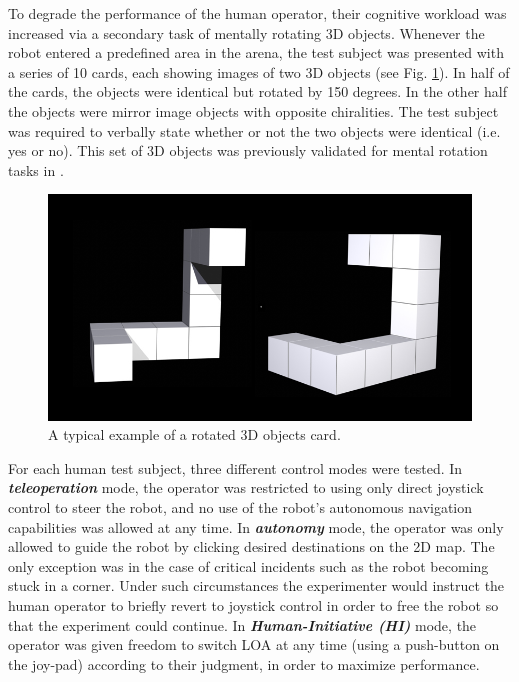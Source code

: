 \documentclass[a4paper,12pt,oneside,openright]{bhamthesis}
\begin{document}
To degrade the performance of the human operator, their cognitive workload was increased via a secondary task of mentally rotating 3D objects. Whenever the robot entered a predefined area in the arena, the test subject was presented with a series of 10 cards, each showing images of two 3D objects (see Fig. \ref{fig:rotation_task_exp2}). In half of the cards, the objects were identical but rotated by 150 degrees. In the other half the objects were mirror image objects with opposite chiralities. The test subject was required to verbally state whether or not the two objects were identical (i.e. yes or no). This set of 3D objects was previously validated for mental rotation tasks in \citep{Ganis2015}.
	
	\begin{figure}
		\centering
		\includegraphics[width=0.45\columnwidth]{chapter4_fig/rotation_example.jpg}
		\caption{A typical example of a rotated 3D objects card.} 
		\label{fig:rotation_task_exp2}
	\end{figure}
	
For each human test subject, three different control modes were tested. In \textbf{\textit{teleoperation}} mode, the operator was restricted to using only direct joystick control to steer the robot, and no use of the robot's autonomous navigation capabilities was allowed at any time. In \textbf{\textit{autonomy}} mode, the operator was only allowed to guide the robot by clicking desired destinations on the 2D map. The only exception was in the case of critical incidents such as the robot becoming stuck in a corner. Under such circumstances the experimenter would instruct the human operator to briefly revert to joystick control in order to free the robot so that the experiment could continue. In \textbf{\textit{Human-Initiative (HI)}} mode, the operator was given freedom to switch LOA at any time (using a push-button on the joy-pad) according to their judgment, in order to maximize performance. 
\end{document}
